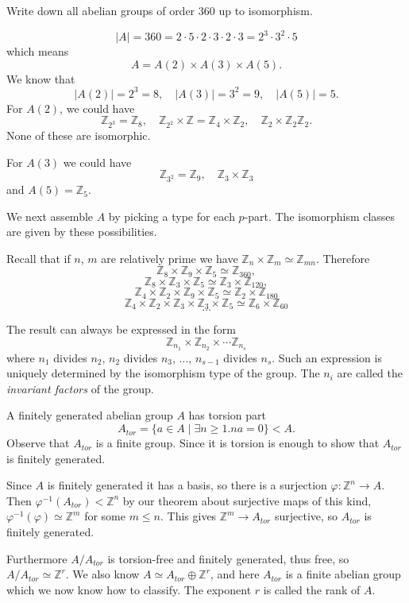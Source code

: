 \begin{xmpl}
Write down all abelian groups of order 360 up to isomorphism.

$$
|A| = 360 = 2 \cdot 5 \cdot 2 \cdot 3 \cdot 2 \cdot 3
          = 2^3 \cdot 3^2 \cdot 5
$$
which means
$$
A = A(2) \times A(3) \times A(5).
$$
We know that
$$
|A(2)| = 2^3 = 8, \quad
|A(3)| = 3^2 = 9, \quad
|A(5)| = 5.
$$
For $A(2)$, we could have
$$
\mathbb{Z}_{2^3} = \mathbb{Z}_8, \quad
\mathbb{Z}_{2^2} \times \mathbb{Z} = \mathbb{Z}_4 \times \mathbb{Z}_2, \quad
\mathbb{Z}_2 \times \mathbb{Z}_2 \mathbb{Z}_2.
$$
None of these are isomorphic.

For $A(3)$ we could have
$$
\mathbb{Z}_{3^2} = \mathbb{Z}_9, \quad \mathbb{Z}_{3} \times \mathbb{Z}_{3}
$$
and
$A(5) = \mathbb{Z}_5$.

We next assemble $A$ by picking a type for each $p$-part. The
isomorphism classes are given by these possibilities.

Recall that if $n$, $m$ are relatively prime we have
$\mathbb{Z}_n \times \mathbb{Z}_m \simeq \mathbb{Z}_{mn}$. Therefore
$$
\mathbb{Z}_8 \times \mathbb{Z}_9 \times \mathbb{Z}_5 \simeq \mathbb{Z}_{360},
$$
$$
\mathbb{Z}_8 \times \mathbb{Z}_3 \times \mathbb{Z}_5 \simeq
\mathbb{Z}_3 \times \mathbb{Z}_{120},
$$
$$
\mathbb{Z}_4 \times \mathbb{Z}_2 \times \mathbb{Z}_9 \times
\mathbb{Z}_5 \simeq \mathbb{Z}_2 \times \mathbb{Z}_{180}
$$
$$
\mathbb{Z}_4 \times \mathbb{Z}_2 \times \mathbb{Z}_3 \times
\mathbb{Z}_3 \times \mathbb{Z}_5 \simeq \mathbb{Z}_6 \times \mathbb{Z}_{60}
$$
$$
\dots
$$

The result can always be expressed in the form
$$
\mathbb{Z}_{n_1} \times \mathbb{Z}_{n_2} \times \cdots \mathbb{Z}_{n_s}
$$
where $n_1$ divides $n_2$, $n_2$ divides $n_3$, $\dots$, $n_{s-1}$
divides $n_s$. Such an expression is uniquely determined by the
isomorphism type of the group. The $n_i$ are called the
\emph{invariant factors} of the group.
\end{xmpl}

\begin{recap}
A finitely generated abelian group $A$ has torsion part
$$
A_{tor} = \{ a \in A \mid \exists n \geq 1 . n a = 0 \} < A.
$$
Observe that $A_{tor}$ is a finite group. Since it is torsion is
enough to show that $A_{tor}$ is finitely generated.

Since $A$ is finitely generated it has a basis, so there is a
surjection $\varphi : \mathbb{Z}^n \to A$. Then
$\varphi^{-1}(A_{tor}) < \mathbb{Z}^n$ by our theorem about surjective
maps of this kind, $\varphi^{-1}(\varphi) \simeq \mathbb{Z}^m$ for
some $m \leq n$. This gives $\mathbb{Z}^m \to A_{tor}$ surjective, so
$A_{tor}$ is finitely generated.

Furthermore $A / A_{tor}$ is torsion-free and finitely generated, thus
free, so $A / A_{tor} \simeq \mathbb{Z}^r$. We also know
$A \simeq A_{tor} \oplus \mathbb{Z}^r$, and here $A_{tor}$ is a
finite abelian group which we now know how to classify.
The exponent $r$ is called the rank of $A$.
\end{recap}
